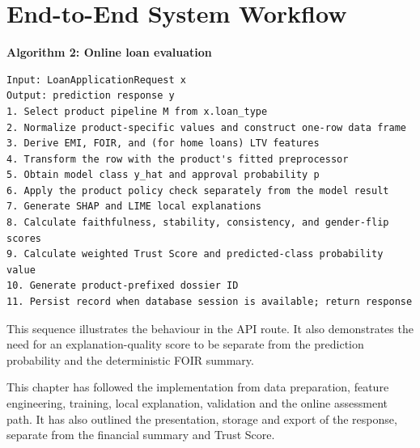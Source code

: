 \clearpage
\section{End-to-End System Workflow}
\noindent\begin{minipage}{\textwidth}
\textbf{Algorithm 2: Online loan evaluation}\par\smallskip
\begin{lstlisting}
Input: LoanApplicationRequest x
Output: prediction response y
1. Select product pipeline M from x.loan_type
2. Normalize product-specific values and construct one-row data frame
3. Derive EMI, FOIR, and (for home loans) LTV features
4. Transform the row with the product's fitted preprocessor
5. Obtain model class y_hat and approval probability p
6. Apply the product policy check separately from the model result
7. Generate SHAP and LIME local explanations
8. Calculate faithfulness, stability, consistency, and gender-flip scores
9. Calculate weighted Trust Score and predicted-class probability value
10. Generate product-prefixed dossier ID
11. Persist record when database session is available; return response
\end{lstlisting}
\end{minipage}\par\medskip

This sequence illustrates the behaviour in the API route. It also demonstrates the need for an explanation-quality score to be separate from the prediction probability and the deterministic FOIR summary.

\par\medskip\noindent
This chapter has followed the implementation from data preparation, feature engineering, training, local explanation, validation and the online assessment path. It has also outlined the presentation, storage and export of the response, separate from the financial summary and Trust Score.

